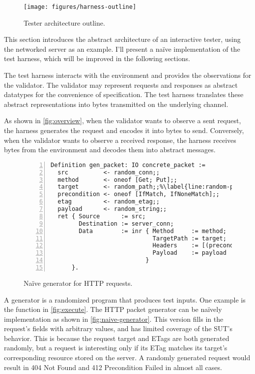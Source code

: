 \begin{figure}[t]
  \centering
  \texttt{[image: figures/harness-outline]}
  \caption{Tester architecture outline.}
  \label{fig:overview}
\end{figure}

This section introduces the abstract architecture of an interactive tester,
using the networked server as an example.  I'll present a na\"ive implementation
of the test harness, which will be improved in the following sections.

The test harness interacts with the environment and provides the observations
for the validator.  The validator may represent requests and responses as
abstract datatypes for the convenience of specification.  The test harness
translates these abstract representations into bytes transmitted on the
underlying channel.

As shown in \autoref{fig:overview}, when the validator wants to observe a sent
request, the harness generates the request and encodes it into bytes to send.
Conversely, when the validator wants to observe a received response, the harness
receives bytes from the environment and decodes them into abstract messages.

\begin{figure}
\begin{lstlisting}[numbers=left]
Definition gen_packet: IO concrete_packet :=
  src          <- random_conn;;
  method       <- oneof [Get; Put];;
  target       <- random_path;;%\label{line:random-path}%
  precondition <- oneof [IfMatch, IfNoneMatch];;
  etag         <- random_etag;;
  payload      <- random_string;;
  ret { Source      := src;
        Destination := server_conn;
        Data        := inr { Method     := method;
                             TargetPath := target;
                             Headers    := [(precondition, etag)];
                             Payload    := payload
                           }
      }.
\end{lstlisting}
\caption{Na\"ive generator for HTTP requests.}
\label{fig:naive-generator}
\end{figure}

A generator is a randomized program that produces test inputs.  One example is
the  function in \autoref{fig:execute}.  The HTTP packet
generator can be na\"ively implementation as shown in
\autoref{fig:naive-generator}.  This version fills in the request's fields with
arbitrary values, and has limited coverage of the SUT's behavior.  This is
because the request target and ETags are both generated randomly, but a request
is interesting only if its ETag matches its target's corresponding resource
stored on the server.  A randomly generated request would result in 404 Not
Found and 412 Precondition Failed in almost all cases.

